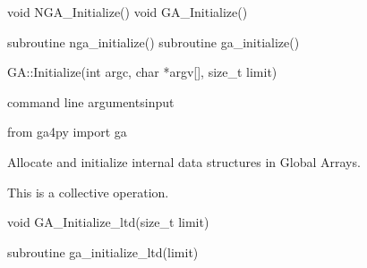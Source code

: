 \documentclass[12pt]{article}
\begin{document}

\begin{capi}
\begin{ccode}
void NGA_Initialize()
void GA_Initialize()
\end{ccode}
\end{capi}

\begin{fapi}
\begin{fcode}
subroutine nga_initialize()
subroutine ga_initialize()
\end{fcode}
\end{fapi}

\begin{cxxapi}
\begin{cxxcode}
GA::Initialize(int argc, char *argv[], size_t limit)
\end{cxxcode}
\begin{funcargs}
 {command line arguments}{input}
\end{funcargs}
\end{cxxapi}

\begin{pyapi}
\begin{pycode}
from ga4py import ga
\end{pycode}
\end{pyapi}

\begin{desc}

Allocate and initialize internal data structures in Global Arrays.

This is a collective operation.

\end{desc}



\begin{capi}
\begin{ccode}
void GA_Initialize_ltd(size_t limit)
\end{ccode}
\begin{funcargs}
\end{funcargs}
\end{capi}

\begin{fapi}
\begin{fcode}
subroutine ga_initialize_ltd(limit)
\end{fcode}
\begin{funcargs}
\end{funcargs}
\end{fapi}
\end{document}

